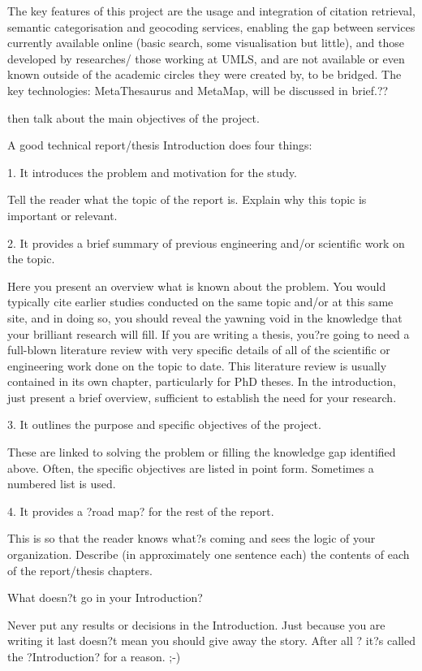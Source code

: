 \documentclass[Report.tex]{subfiles}
\begin{document}
The key features of this project are the usage and integration of citation retrieval, semantic categorisation and geocoding services, enabling the gap between services currently available online (basic search, some visualisation but little), and those developed by researches/ those working at UMLS, and are not available or even known outside of the academic circles they were created by, to be bridged. The key technologies: MetaThesaurus and MetaMap, will be discussed in brief.??


then talk about the main objectives of the project.

A good technical report/thesis Introduction does four things:

1.       It introduces the problem and motivation for the study.

    Tell the reader what the topic of the report is.
    Explain why this topic is important or relevant.

2.       It provides a brief summary of previous engineering and/or scientific work on the topic.

    Here you present an overview what is known about the problem.  You would typically cite earlier studies conducted on the same topic and/or at this same site, and in doing so, you should reveal the yawning void in the knowledge that your brilliant research will fill.
    If you are writing a thesis, you?re going to need a full-blown literature review with very specific details of all of the scientific or engineering work done on the topic to date.  This literature review is usually contained in its own chapter, particularly for PhD theses.  In the introduction, just present a brief overview, sufficient to establish the need for your research.

3.       It outlines the purpose and specific objectives of the project.

    These are linked to solving the problem or filling the knowledge gap identified above.
    Often, the specific objectives are listed in point form. Sometimes a numbered list is used.

4.       It provides a ?road map? for the rest of the report.

    This is so that the reader knows what?s coming and sees the logic of your organization.
    Describe (in approximately one sentence each) the contents of each of the report/thesis chapters.

What doesn?t go in your Introduction?

    Never put any results or decisions in the Introduction.  Just because you are writing it last doesn?t mean you should give away the story. After all ? it?s called the ?Introduction? for a reason. ;-)
\end{document}
